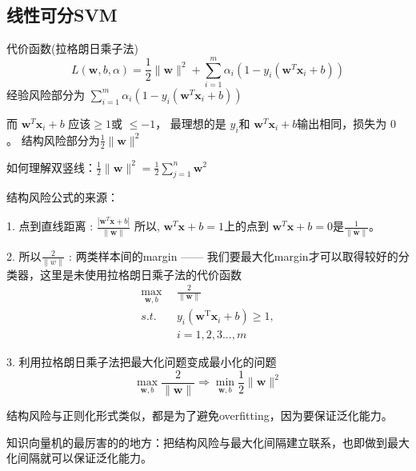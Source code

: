 \subsection{线性可分SVM}
\begin{outline}
	\1 代价函数(拉格朗日乘子法)
\begin{equation}\label{eq:9}
	L(\mathbf{w}, b, \alpha)=\frac{1}{2}\|\mathbf{w}\|^{2}+\sum_{i=1}^{m} \alpha_{i}\left(1-y_{i}\left(\mathbf{w}^{T} \mathbf{x}_{i}+b\right)\right)
\end{equation}
\2 经验风险部分为
$\sum_{i=1}^{m} \alpha_{i}\left(1-y_{i}\left(\mathbf{w}^{T} \mathbf{x}_{i}+b\right)\right)$

而  $\mathbf{w}^{T} \mathbf{x}_{i}+b $ 应该$  \geq 1  $或 $ \leq-1 $，
最理想的是 $ y_{i}  $和 $ \mathbf{w}^{T} \mathbf{x}_{i}+b  $输出相同，损失为 0 。
\2 结构风险部分为$\frac{1}{2}\|\mathbf{w}\|^{2}$

\3 如何理解双竖线：$\frac{1}{2}\|\mathbf{w}\|^{2}=\frac{1}{2} \sum_{j=1}^{n} \mathbf{w}^{2}$

\3 结构风险公式的来源：

1. 点到直线距离 : $\frac{\left|\mathbf{w}^{T} \mathbf{x}+b\right|}{\|\mathbf{w}\|} $
所以,  $\mathbf{w}^{T} \mathbf{x}+b=1  $上的点到  $\mathbf{w}^{T} \mathbf{x}+b=0  $是$  \frac{1}{\|\mathbf{w}\|}  $。

2. 所以$\frac{2}{\|w\|} $ : 两类样本间的margin —— 我们要最大化margin才可以取得较好的分类器，这里是未使用拉格朗日乘子法的代价函数
\begin{equation}
	\begin{aligned}
		\max _{\mathbf{w}, b} &\frac{2}{\|\mathbf{w}\|}\\
s.t.   \quad  & {y_{i}\left(\mathbf{w}^{\mathrm{T}} \mathbf{x}_{i}+b\right) \geqslant 1},\\
&i=1,2,3...,m
	\end{aligned}
\end{equation}

3. 利用拉格朗日乘子法把最大化问题变成最小化的问题
\begin{equation}
	\max _{\mathbf{w}, b} \frac{2}{\|\mathbf{w}\|}\Longrightarrow \min _{\mathbf{w}, b}\frac{1}{2}\|\mathbf{w}\|^{2}
\end{equation}

结构风险与正则化形式类似，都是为了避免overfitting，因为要保证泛化能力。

知识向量机的最厉害的的地方：把结构风险与最大化间隔建立联系，也即做到最大化间隔就可以保证泛化能力。


\end{outline}
